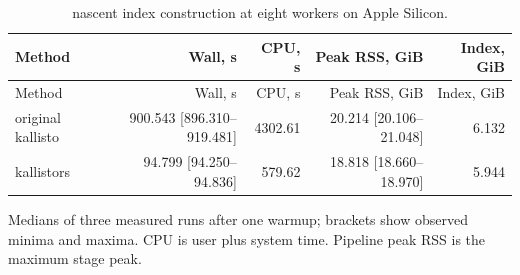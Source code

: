 \begingroup
\small
\setlength{\tabcolsep}{4pt}
\begin{longtable}{@{}lrrrr@{}}
\caption{nascent index construction at eight workers on Apple Silicon.}\label{tab:paper-index-nascent}\\
\toprule
Method & Wall, s & CPU, s & Peak RSS, GiB & Index, GiB \\
\midrule
\endfirsthead
\toprule
Method & Wall, s & CPU, s & Peak RSS, GiB & Index, GiB \\
\midrule
\endhead
\bottomrule
\endfoot
original kallisto & 900.543 [896.310--919.481] & 4302.61 & 20.214 [20.106--21.048] & 6.132 \\
kallistors & 94.799 [94.250--94.836] & 579.62 & 18.818 [18.660--18.970] & 5.944 \\
\end{longtable}
\noindent\footnotesize Medians of three measured runs after one warmup; brackets show observed minima and maxima. CPU is user plus system time. Pipeline peak RSS is the maximum stage peak.
\endgroup
